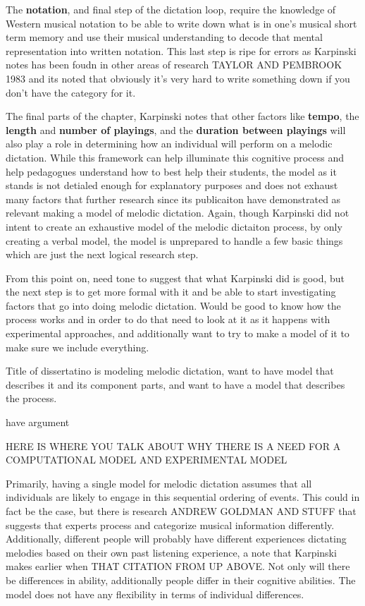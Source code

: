 \documentclass[]{book}
\theoremstyle{definition}
\theoremstyle{definition}
\theoremstyle{definition}
\theoremstyle{remark}
\begin{document}
The \textbf{notation}, and final step of the dictation loop, require the
knowledge of Western musical notation to be able to write down what is
in one's musical short term memory and use their musical understanding
to decode that mental representation into written notation. This last
step is ripe for errors as Karpinski notes has been foudn in other areas
of research TAYLOR AND PEMBROOK 1983 and its noted that obviously it's
very hard to write something down if you don't have the category for it.

The final parts of the chapter, Karpinski notes that other factors like
\textbf{tempo}, the \textbf{length} and \textbf{number of playings}, and
the \textbf{duration between playings} will also play a role in
determining how an individual will perform on a melodic dictation. While
this framework can help illuminate this cognitive process and help
pedagogues understand how to best help their students, the model as it
stands is not detialed enough for explanatory purposes and does not
exhaust many factors that further research since its publicaiton have
demonstrated as relevant making a model of melodic dictation. Again,
though Karpinski did not intent to create an exhaustive model of the
melodic dictaiton process, by only creating a verbal model, the model is
unprepared to handle a few basic things which are just the next logical
research step.

From this point on, need tone to suggest that what Karpinski did is
good, but the next step is to get more formal with it and be able to
start investigating factors that go into doing melodic dictation. Would
be good to know how the process works and in order to do that need to
look at it as it happens with experimental approaches, and additionally
want to try to make a model of it to make sure we include everything.

Title of dissertatino is modeling melodic dictation, want to have model
that describes it and its component parts, and want to have a model that
describes the process.

have argument

HERE IS WHERE YOU TALK ABOUT WHY THERE IS A NEED FOR A COMPUTATIONAL
MODEL AND EXPERIMENTAL MODEL

Primarily, having a single model for melodic dictation assumes that all
individuals are likely to engage in this sequential ordering of events.
This could in fact be the case, but there is research ANDREW GOLDMAN AND
STUFF that suggests that experts process and categorize musical
information differently. Additionally, different people will probably
have different experiences dictating melodies based on their own past
listening experience, a note that Karpinski makes earlier when THAT
CITATION FROM UP ABOVE. Not only will there be differences in ability,
additionally people differ in their cognitive abilities. The model does
not have any flexibility in terms of individual differences.
\end{document}
